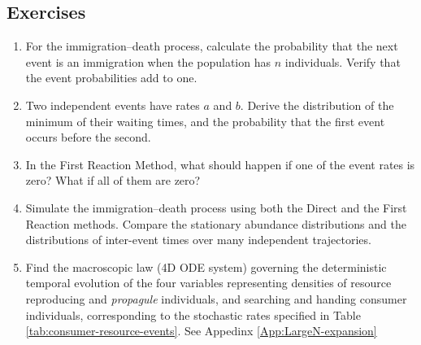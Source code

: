 \subsection{Exercises}
\begin{enumerate}
 \item For the immigration--death process, calculate the probability that the next event is an immigration when the population has $n$ individuals. Verify that the event probabilities add to one.
 \item Two independent events have rates $a$ and $b$. Derive the distribution of the minimum of their waiting times, and the probability that the first event occurs before the second.
 \item In the First Reaction Method, what should happen if one of the event rates is zero? What if all of them are zero?
 \item Simulate the immigration--death process using both the Direct and the First Reaction methods. Compare the stationary abundance distributions and the distributions of inter-event times over many independent trajectories.
 \item Find the macroscopic law (4D ODE system) governing the deterministic temporal evolution of the four variables representing densities of resource reproducing and {\em propagule} individuals, and searching and handing consumer individuals, corresponding to the stochastic rates specified in Table \ref{tab:consumer-resource-events}. See Appedinx \ref{App:LargeN-expansion}  
\end{enumerate}
